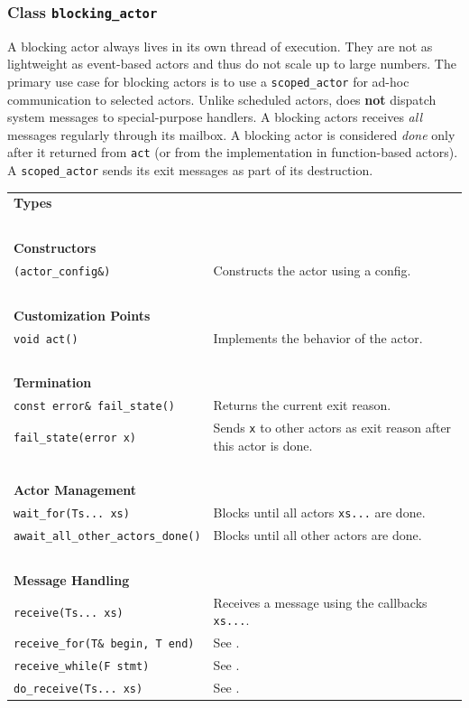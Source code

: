\clearpage
\subsubsection{Class \lstinline^blocking_actor^}

A blocking actor always lives in its own thread of execution. They are not as lightweight as event-based actors and thus do not scale up to large numbers. The primary use case for blocking actors is to use a \lstinline^scoped_actor^ for ad-hoc communication to selected actors. Unlike scheduled actors, \lib does \textbf{not} dispatch system messages to special-purpose handlers. A blocking actors receives \emph{all} messages regularly through its mailbox. A blocking actor is considered \emph{done} only after it returned from \lstinline^act^ (or from the implementation in function-based actors). A \lstinline^scoped_actor^ sends its exit messages as part of its destruction.

\begin{center}
\small
\begin{tabular}{ll}
  \textbf{Types} & ~ \\
  ~ & ~ \\ \textbf{Constructors} & ~ \\
  \hline
  \lstinline^(actor_config&)^ & Constructs the actor using a config. \\
  \hline
  ~ & ~ \\ \textbf{Customization Points} & ~ \\
  \hline
  \lstinline^void act()^ & Implements the behavior of the actor. \\
  \hline
  ~ & ~ \\ \textbf{Termination} & ~ \\
  \hline
  \lstinline^const error& fail_state()^ & Returns the current exit reason. \\
  \hline
  \lstinline^fail_state(error x)^ & Sends \lstinline^x^ to other actors as exit reason after this actor is done. \\
  \hline
  ~ & ~ \\ \textbf{Actor Management} & ~ \\
  \hline
  \lstinline^wait_for(Ts... xs)^ & Blocks until all actors \lstinline^xs...^ are done. \\
  \hline
  \lstinline^await_all_other_actors_done()^ & Blocks until all other actors are done. \\
  \hline
  ~ & ~ \\ \textbf{Message Handling} & ~ \\
  \hline
  \lstinline^receive(Ts... xs)^ & Receives a message using the callbacks \lstinline^xs...^. \\
  \hline
  \lstinline^receive_for(T& begin, T end)^ & See . \\
  \hline
  \lstinline^receive_while(F stmt)^ & See . \\
  \hline
  \lstinline^do_receive(Ts... xs)^ & See . \\
  \hline
\end{tabular}
\end{center}

